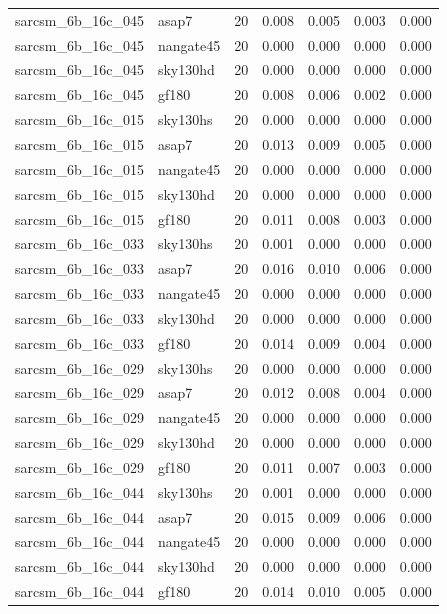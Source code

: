 \begin{tabular}{llrrrrr}
sarcsm\_6b\_16c\_045 & asap7 & 20 & 0.008 & 0.005 & 0.003 & 0.000 \\
sarcsm\_6b\_16c\_045 & nangate45 & 20 & 0.000 & 0.000 & 0.000 & 0.000 \\
sarcsm\_6b\_16c\_045 & sky130hd & 20 & 0.000 & 0.000 & 0.000 & 0.000 \\
sarcsm\_6b\_16c\_045 & gf180 & 20 & 0.008 & 0.006 & 0.002 & 0.000 \\
sarcsm\_6b\_16c\_015 & sky130hs & 20 & 0.000 & 0.000 & 0.000 & 0.000 \\
sarcsm\_6b\_16c\_015 & asap7 & 20 & 0.013 & 0.009 & 0.005 & 0.000 \\
sarcsm\_6b\_16c\_015 & nangate45 & 20 & 0.000 & 0.000 & 0.000 & 0.000 \\
sarcsm\_6b\_16c\_015 & sky130hd & 20 & 0.000 & 0.000 & 0.000 & 0.000 \\
sarcsm\_6b\_16c\_015 & gf180 & 20 & 0.011 & 0.008 & 0.003 & 0.000 \\
sarcsm\_6b\_16c\_033 & sky130hs & 20 & 0.001 & 0.000 & 0.000 & 0.000 \\
sarcsm\_6b\_16c\_033 & asap7 & 20 & 0.016 & 0.010 & 0.006 & 0.000 \\
sarcsm\_6b\_16c\_033 & nangate45 & 20 & 0.000 & 0.000 & 0.000 & 0.000 \\
sarcsm\_6b\_16c\_033 & sky130hd & 20 & 0.000 & 0.000 & 0.000 & 0.000 \\
sarcsm\_6b\_16c\_033 & gf180 & 20 & 0.014 & 0.009 & 0.004 & 0.000 \\
sarcsm\_6b\_16c\_029 & sky130hs & 20 & 0.000 & 0.000 & 0.000 & 0.000 \\
sarcsm\_6b\_16c\_029 & asap7 & 20 & 0.012 & 0.008 & 0.004 & 0.000 \\
sarcsm\_6b\_16c\_029 & nangate45 & 20 & 0.000 & 0.000 & 0.000 & 0.000 \\
sarcsm\_6b\_16c\_029 & sky130hd & 20 & 0.000 & 0.000 & 0.000 & 0.000 \\
sarcsm\_6b\_16c\_029 & gf180 & 20 & 0.011 & 0.007 & 0.003 & 0.000 \\
sarcsm\_6b\_16c\_044 & sky130hs & 20 & 0.001 & 0.000 & 0.000 & 0.000 \\
sarcsm\_6b\_16c\_044 & asap7 & 20 & 0.015 & 0.009 & 0.006 & 0.000 \\
sarcsm\_6b\_16c\_044 & nangate45 & 20 & 0.000 & 0.000 & 0.000 & 0.000 \\
sarcsm\_6b\_16c\_044 & sky130hd & 20 & 0.000 & 0.000 & 0.000 & 0.000 \\
sarcsm\_6b\_16c\_044 & gf180 & 20 & 0.014 & 0.010 & 0.005 & 0.000 \\

\end{tabular}
